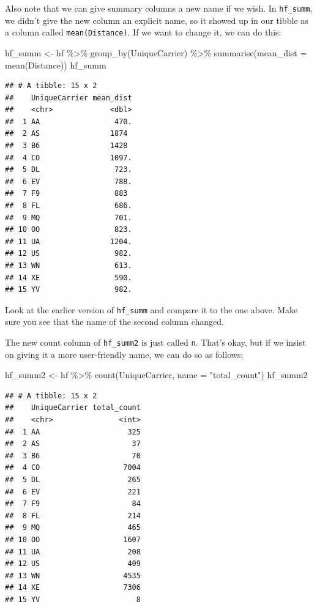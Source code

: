 \documentclass[
]{book}
\newenvironment{Shaded}{\begin{snugshade}}{\end{snugshade}}
\newcommand{\AttributeTok}[1]{\textcolor[rgb]{0.77,0.63,0.00}{#1}}
\newcommand{\FunctionTok}[1]{\textcolor[rgb]{0.00,0.00,0.00}{#1}}
\newcommand{\NormalTok}[1]{#1}
\newcommand{\OtherTok}[1]{\textcolor[rgb]{0.56,0.35,0.01}{#1}}
\newcommand{\SpecialCharTok}[1]{\textcolor[rgb]{0.00,0.00,0.00}{#1}}
\newcommand{\StringTok}[1]{\textcolor[rgb]{0.31,0.60,0.02}{#1}}
\begin{document}
Also note that we can give summary columns a new name if we wish. In \texttt{hf\_summ}, we didn't give the new column an explicit name, so it showed up in our tibble as a column called \texttt{mean(Distance)}. If we want to change it, we can do this:

\begin{Shaded}
\begin{Highlighting}[]
\NormalTok{hf\_summ }\OtherTok{\textless{}{-}}\NormalTok{ hf }\SpecialCharTok{\%\textgreater{}\%}
    \FunctionTok{group\_by}\NormalTok{(UniqueCarrier) }\SpecialCharTok{\%\textgreater{}\%}
    \FunctionTok{summarise}\NormalTok{(}\AttributeTok{mean\_dist =} \FunctionTok{mean}\NormalTok{(Distance))}
\NormalTok{hf\_summ}
\end{Highlighting}
\end{Shaded}

\begin{verbatim}
## # A tibble: 15 x 2
##    UniqueCarrier mean_dist
##    <chr>             <dbl>
##  1 AA                 470.
##  2 AS                1874 
##  3 B6                1428 
##  4 CO                1097.
##  5 DL                 723.
##  6 EV                 788.
##  7 F9                 883 
##  8 FL                 686.
##  9 MQ                 701.
## 10 OO                 823.
## 11 UA                1204.
## 12 US                 982.
## 13 WN                 613.
## 14 XE                 590.
## 15 YV                 982.
\end{verbatim}

Look at the earlier version of \texttt{hf\_summ} and compare it to the one above. Make sure you see that the name of the second column changed.

The new count column of \texttt{hf\_summ2} is just called \texttt{n}. That's okay, but if we insist on giving it a more user-friendly name, we can do so as follows:

\begin{Shaded}
\begin{Highlighting}[]
\NormalTok{hf\_summ2 }\OtherTok{\textless{}{-}}\NormalTok{ hf }\SpecialCharTok{\%\textgreater{}\%}
    \FunctionTok{count}\NormalTok{(UniqueCarrier, }\AttributeTok{name =} \StringTok{"total\_count"}\NormalTok{)}
\NormalTok{hf\_summ2}
\end{Highlighting}
\end{Shaded}

\begin{verbatim}
## # A tibble: 15 x 2
##    UniqueCarrier total_count
##    <chr>               <int>
##  1 AA                    325
##  2 AS                     37
##  3 B6                     70
##  4 CO                   7004
##  5 DL                    265
##  6 EV                    221
##  7 F9                     84
##  8 FL                    214
##  9 MQ                    465
## 10 OO                   1607
## 11 UA                    208
## 12 US                    409
## 13 WN                   4535
## 14 XE                   7306
## 15 YV                      8
\end{verbatim}
\end{document}
